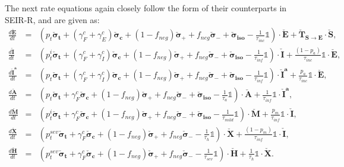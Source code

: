 \documentclass[notitlepage, superscriptaddress]{revtex4-2}
\begin{document}
The next rate equations again closely follow the form of their counterparts in SEIR-R, and are given as:
\begin{eqnarray}
%
\frac{d \boldsymbol{\check{E}}}{dt} &=& \left( p_{t} \boldsymbol{\check{\sigma}_{t}} + (\gamma^{c}_{F} + \gamma^{c}_{E}) \boldsymbol{\check{\sigma}_{c}} + (1-f_{neg}) \boldsymbol{\check{\sigma}_{+}} + f_{neg} \boldsymbol{\check{\sigma}_{-}} + \boldsymbol{\check{\sigma}_{iso}} - \frac{1}{\tau_{inc}} \mathbb{1} \right) \cdot \boldsymbol{\check{E}} + \boldsymbol{\check{T}_{S \rightarrow E}} \cdot \boldsymbol{\check{S}}, \\
%
\frac{d \boldsymbol{\check{I}}}{dt} &=& \left( p^{i}_{t} \boldsymbol{\check{\sigma}_{t}} + (\gamma^{c}_{F} + \gamma^{c}_{I}) \boldsymbol{\check{\sigma}_{c}} + (1-f_{neg}) \boldsymbol{\check{\sigma}_{+}} + f_{neg} \boldsymbol{\check{\sigma}_{-}} + \boldsymbol{\check{\sigma}_{iso}} - \frac{1}{\tau_{inf}} \mathbb{1} \right) \cdot \boldsymbol{\check{I}} + \frac{(1-p_{a})}{\tau_{inc}} \mathbb{1} \cdot \boldsymbol{\check{E}}, \\ 
%
\frac{d \boldsymbol{\check{I}^{a}}}{dt} &=& \left( p_{t} \boldsymbol{\check{\sigma}_{t}} + (\gamma^{c}_{F} + \gamma^{c}_{I}) \boldsymbol{\check{\sigma}_{c}} + (1-f_{neg}) \boldsymbol{\check{\sigma}_{+}} + f_{neg} \boldsymbol{\check{\sigma}_{-}} + \boldsymbol{\check{\sigma}_{iso}} - \frac{1}{\tau_{inf}} \mathbb{1} \right) \cdot \boldsymbol{\check{I}^{a}} + \frac{p_{a}}{\tau_{inc}} \mathbb{1} \cdot \boldsymbol{\check{E}}, \\
%
\frac{d \boldsymbol{\check{A}}}{dt} &=& \left( p_{t} \boldsymbol{\check{\sigma}_{t}} + \gamma^{c}_{F} \boldsymbol{\check{\sigma}_{c}} + (1-f_{neg}) \boldsymbol{\check{\sigma}_{+}} + f_{neg} \boldsymbol{\check{\sigma}_{-}} + \boldsymbol{\check{\sigma}_{iso}} - \frac{1}{\tau_{a}} \mathbb{1} \right) \cdot \boldsymbol{\check{A}} + \frac{1}{\tau_{inf}} \mathbb{1} \cdot \boldsymbol{\check{I}^{a}}, \\
%
\frac{d \boldsymbol{\check{M}}}{dt} &=& \left( p^{i}_{t} \boldsymbol{\check{\sigma}_{t}} + \gamma^{c}_{F} \boldsymbol{\check{\sigma}_{c}} + (1-f_{neg}) \boldsymbol{\check{\sigma}_{+}} + f_{neg} \boldsymbol{\check{\sigma}_{-}} + \boldsymbol{\check{\sigma}_{iso}} - \frac{1}{\tau_{mild}} \mathbb{1} \right) \cdot \boldsymbol{\check{M}} + \frac{p_{m}}{\tau_{inf}} \mathbb{1} \cdot \boldsymbol{\check{I}}, \\ 
%
\frac{d \boldsymbol{\check{X}}}{dt} &=& \left( p^{sev}_{t} \boldsymbol{\check{\sigma}_{t}} + \gamma^{c}_{F} \boldsymbol{\check{\sigma}_{c}} + (1-f_{neg}) \boldsymbol{\check{\sigma}_{+}} + f_{neg} \boldsymbol{\check{\sigma}_{-}} - \frac{1}{\tau_{h}} \mathbb{1} \right) \cdot \boldsymbol{\check{X}} + \frac{(1-p_{m})}{\tau_{inf}} \mathbb{1} \cdot \boldsymbol{\check{I}}, \\
% 
\frac{d \boldsymbol{\check{H}}}{dt} &=& \left( p^{sev}_{t} \boldsymbol{\check{\sigma}_{t}} + \gamma^{c}_{F} \boldsymbol{\check{\sigma}_{c}} + (1-f_{neg}) \boldsymbol{\check{\sigma}_{+}} + f_{neg} \boldsymbol{\check{\sigma}_{-}} - \frac{1}{\tau_{sev}} \mathbb{1} \right) \cdot \boldsymbol{\check{H}} + \frac{1}{\tau_{h}} \mathbb{1} \cdot \boldsymbol{\check{X}}.
\end{eqnarray}
\end{document}
